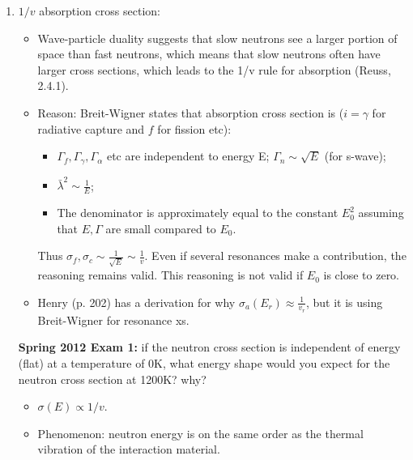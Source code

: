 \documentclass{school-22.211-notes}
\begin{document}
\begin{enumerate}
\item $1/v$ absorption cross section: 
  \begin{itemize}
  \item Wave-particle duality suggests that slow neutrons see a larger portion of space than fast neutrons, which means that slow neutrons often have larger cross sections, which leads to the 1/v rule for absorption (Reuss, 2.4.1). 
  \item Reason: Breit-Wigner states that absorption cross section is ($i = \gamma$ for radiative capture and $f$ for fission etc):
    \begin{itemize}
    \item $\Gamma_f, \Gamma_{\gamma}, \Gamma_{\alpha}$ etc are independent to energy E; $\Gamma_n \sim \sqrt{E}$ (for s-wave);
    \item $\bar{\lambda}^2 \sim \frac{1}{E}$;
    \item The denominator is approximately equal to the constant $E_0^2$ assuming that $E, \Gamma$ are small compared to $E_0$.
    \end{itemize}
    Thus $\sigma_f, \sigma_c \sim \frac{1}{\sqrt{E}} \sim \frac{1}{v}$. Even if several resonances make a contribution, the reasoning remains valid. This reasoning is not valid if $E_0$ is close to zero. 
  \item Henry (p. 202) has a derivation for why $\sigma_a(E_r) \approx \frac{1}{v_r}$, but it is using Breit-Wigner for resonance xs. 
  \end{itemize}
  \textbf{Spring 2012 Exam 1:} if the neutron cross section is independent of energy (flat) at a temperature of 0K, what energy shape would you expect for the neutron cross section at 1200K? why? 
  \begin{itemize}
    \item $\sigma(E) \propto 1/v$.
    \item Phenomenon: neutron energy is on the same order as the thermal vibration of the interaction material. 
  \end{itemize}



\end{enumerate}
\end{document}
